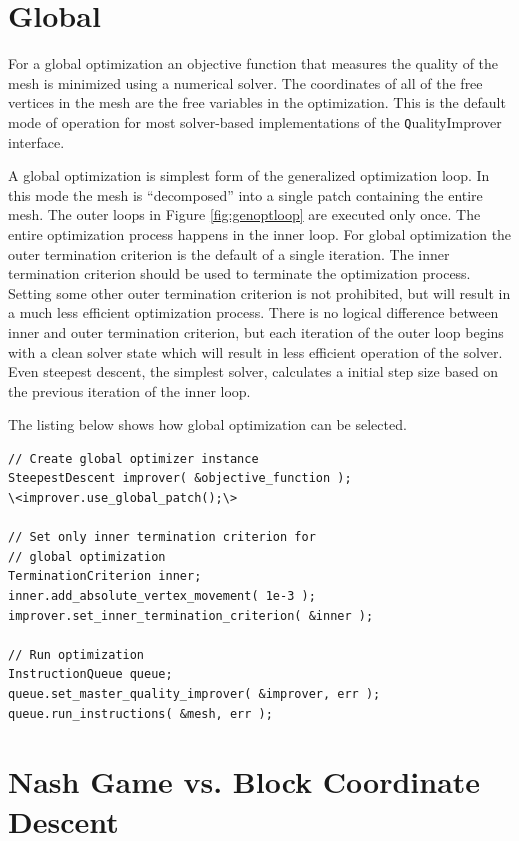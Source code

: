 \section{Global \label{sec:global}}

For a global optimization an objective function that measures the quality of the mesh is minimized using a numerical solver.  The coordinates of all of the free vertices in the mesh are the free variables in the optimization.  This is the default mode of operation for most solver-based implementations of the {\texttt QualityImprover} interface.

A global optimization is simplest form of the generalized optimization loop.  In this mode the mesh is ``decomposed'' into a single patch containing the entire mesh.  The outer loops in Figure \ref{fig:genoptloop} are executed only once.  The entire optimization process happens in the inner loop.  For global optimization the outer termination criterion is the default of a single iteration.  The inner termination criterion should be used to terminate the optimization process.  Setting some other outer termination criterion is not prohibited, but will result in a much less efficient optimization process.  There is no logical difference between inner and outer termination criterion, but each iteration of the outer loop begins with a clean solver state which will result in less efficient operation of the solver.  Even steepest descent, the simplest solver, calculates a initial step size based on the previous iteration of the inner loop.  

The listing below shows how global optimization can be selected.

\begin{lstlisting}[frame=single]
// Create global optimizer instance
SteepestDescent improver( &objective_function );
\<improver.use_global_patch();\>

// Set only inner termination criterion for 
// global optimization
TerminationCriterion inner;
inner.add_absolute_vertex_movement( 1e-3 );
improver.set_inner_termination_criterion( &inner );

// Run optimization
InstructionQueue queue;
queue.set_master_quality_improver( &improver, err );
queue.run_instructions( &mesh, err );
\end{lstlisting}


\section{Nash Game vs. Block Coordinate Descent}

